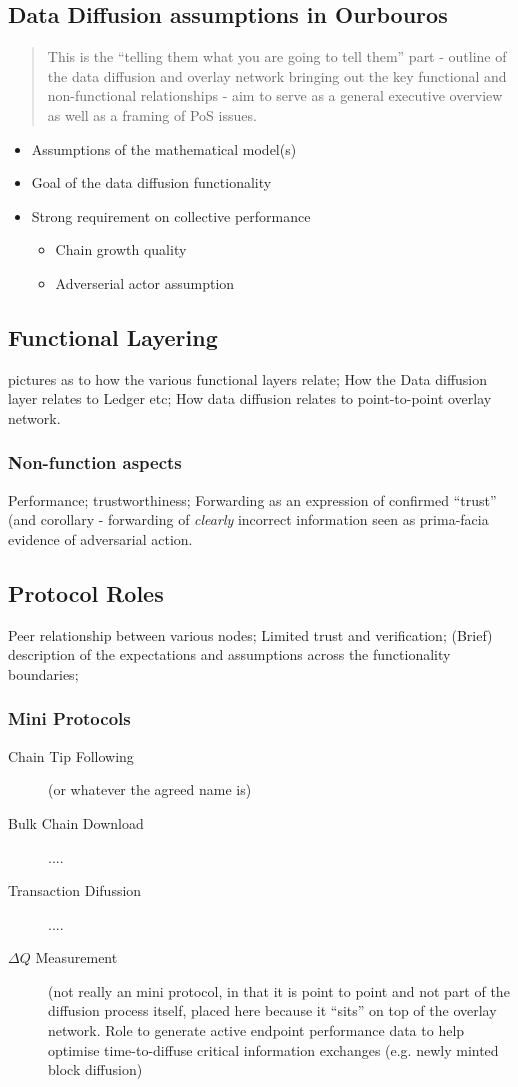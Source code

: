 \documentclass{report}
\theoremstyle{definition}{
  \newtheorem{lemma}{Lemma}[section] %
  \newtheorem{definition}[lemma]{Definition}
}
\theoremstyle{theorem}{
  \newtheorem{invariant}[lemma]{Invariant}
  \newtheorem{proofobligation}[lemma]{Proof Obligation}
}
\numberwithin{equation}{lemma}
\begin{document}
\subsection{Data Diffusion assumptions in Ourbouros}
\begin{quote}
  This is the ``telling them what you are going to tell them'' part -
  outline of the data diffusion and overlay network bringing out the
  key functional and non-functional relationships - aim to serve as a
  general executive overview as well as a framing of PoS issues.
\end{quote}
\begin{itemize}
  \item Assumptions of the mathematical model(s)
  \item Goal of the data diffusion functionality
  \item Strong requirement on collective performance
  \begin{itemize}
    \item Chain growth quality
    \item Adverserial actor assumption
  \end{itemize}
\end{itemize}
\subsection{Functional Layering}
pictures as to how the various functional layers relate; How the Data
diffusion layer relates to Ledger etc; How data diffusion relates to
point-to-point overlay network.

\subsubsection{Non-function aspects}
Performance; trustworthiness; Forwarding as an expression of confirmed
``trust'' (and corollary - forwarding of \emph{clearly} incorrect information
seen as prima-facia evidence of adversarial action.
\subsection{Protocol Roles}
Peer relationship between various nodes; Limited trust and
verification; (Brief) description of the expectations and assumptions across
the functionality boundaries; 

\subsubsection{Mini Protocols}
\begin{description}
\item[Chain Tip Following] (or whatever the agreed name is)
\item[Bulk Chain Download] ....
\item[Transaction Difussion] ....
\item[$\Delta Q$ Measurement] (not really an mini protocol, in that it
  is point to point and not part of the diffusion process itself,
  placed here because it ``sits'' on top of the overlay network. Role
  to generate active endpoint performance data to help optimise
  time-to-diffuse critical information exchanges (e.g. newly minted
  block diffusion)
\end{description}  
\end{document}
